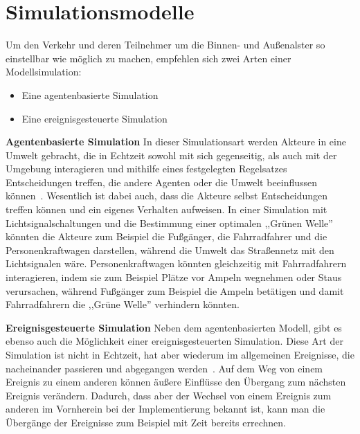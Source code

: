 %
%
\section{Simulationsmodelle}\label{sec:simulationsmodelle}

Um den Verkehr und deren Teilnehmer um die Binnen- und Außenalster so einstellbar wie möglich zu machen, empfehlen sich zwei Arten einer Modellsimulation:

\begin{itemize}

    \item Eine agentenbasierte Simulation
    \item Eine ereignisgesteuerte Simulation

\end{itemize}

\textbf{Agentenbasierte Simulation}
In dieser Simulationsart werden Akteure in eine Umwelt gebracht, die in Echtzeit sowohl mit sich gegenseitig, als auch mit der Umgebung interagieren und mithilfe eines festgelegten Regelsatzes Entscheidungen treffen, die andere Agenten oder die Umwelt beeinflussen können~\cite{Baldwin2015}.
Wesentlich ist dabei auch, dass die Akteure selbst Entscheidungen treffen können und ein eigenes Verhalten aufweisen.
In einer Simulation mit Lichtsignalschaltungen und die Bestimmung einer optimalen ,,Grünen Welle'' könnten die Akteure zum Beispiel die Fußgänger, die Fahrradfahrer und die Personenkraftwagen darstellen, während die Umwelt das Straßennetz mit den Lichtsignalen wäre.
Personenkraftwagen könnten gleichzeitig mit Fahrradfahrern interagieren, indem sie zum Beispiel Plätze vor Ampeln wegnehmen oder Staus verursachen, während Fußgänger zum Beispiel die Ampeln betätigen und damit Fahrradfahrern die ,,Grüne Welle'' verhindern könnten.

\textbf{Ereignisgesteuerte Simulation}
Neben dem agentenbasierten Modell, gibt es ebenso auch die Möglichkeit einer ereignisgesteuerten Simulation.
Diese Art der Simulation ist nicht in Echtzeit, hat aber wiederum im allgemeinen Ereignisse, die nacheinander passieren und abgegangen werden~\cite{Baldwin2015}.
Auf dem Weg von einem Ereignis zu einem anderen können äußere Einflüsse den Übergang zum nächsten Ereignis verändern.
Dadurch, dass aber der Wechsel von einem Ereignis zum anderen im Vornherein bei der Implementierung bekannt ist, kann man die Übergänge der Ereignisse zum Beispiel mit Zeit bereits errechnen.
